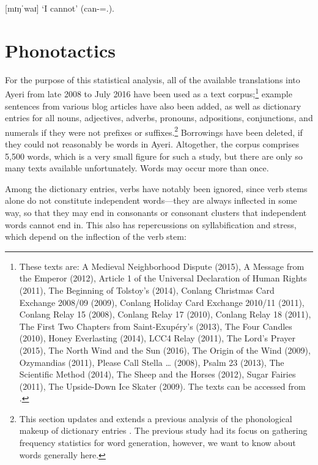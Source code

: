 \ex
	 [mɪŋˈwaɪ] `I cannot' (can-\Neg{}=\Fsg{}.\Top{}).
\xe

\section{Phonotactics}

For the purpose of this statistical analysis, all of the available translations 
into Ayeri from late 2008 to July 2016 have been used as a text 
corpus;\footnote{These texts are:
A Medieval Neighborhood Dispute (2015),
A Message from the Emperor (2012),
Article 1 of the Universal Declaration of Human Rights (2011),
The Beginning of Tolstoy's  (2014),
Conlang Christmas Card Exchange 2008/09 (2009),
Conlang Holiday Card Exchange 2010/11 (2011),
Conlang Relay 15 (2008),
Conlang Relay 17 (2010),
Conlang Relay 18 (2011),
The First Two Chapters from Saint-Exupéry's  (2013),
The Four Candles (2010),
Honey Everlasting (2014),
LCC4 Relay (2011),
The Lord's Prayer (2015),
The North Wind and the Sun (2016),
The Origin of the Wind (2009),
Ozymandias (2011),
Please Call Stella … (2008),
Psalm 23 (2013),
The Scientific Method (2014),
The Sheep and the Horses (2012),
Sugar Fairies (2011),
The Upside-Down Ice Skater (2009).
The texts can be accessed from \citet[Examples]{benung}.
} example sentences from 
various blog articles have also been added, as well as dictionary entries for 
all nouns, adjectives, adverbs, pronouns, adpositions, conjunctions, and 
numerals if they were not prefixes or suffixes.\footnote{This section updates 
and extends a previous analysis of the phonological makeup of dictionary entries 
\autocite{becker:frequency}. The previous study had its focus on gathering 
frequency statistics for word generation, however, we want to know about words 
generally here.} Borrowings have been deleted, if they could not reasonably be 
words in Ayeri. Altogether, the corpus comprises 5,500 words, which is a very 
small figure for such a study, but there are only so many texts available 
unfortunately. Words may occur more than once.

Among the dictionary entries, verbs have notably been ignored, since verb stems 
alone do not constitute independent words---they are always inflected in some 
way, so that they may end in consonants or consonant clusters that independent 
words cannot end in. This also has repercussions on syllabification and stress, 
which depend on the inflection of the verb stem:

